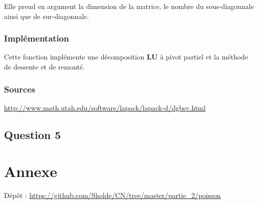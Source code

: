 \documentclass[11pt]{article}
\begin{document}
Elle prend en argument la dimension de la matrice, le nombre du
sous-diagonnale ainsi que de sur-diagonnale.

\subsubsection{Implémentation}
\label{sec:orgca7c1c3}

Cette fonction implémente une décomposition \textbf{LU} à pivot partiel et
la méthode de dessente et de remonté.

\subsubsection{Sources}
\label{sec:org86015d0}

\url{http://www.math.utah.edu/software/lapack/lapack-d/dgbsv.html}

\subsection{Question 5}
\label{sec:orgdb19e77}
\section{Annexe}
\label{sec:org4a46c2c}

Dépôt : \url{https://github.com/Sholde/CN/tree/master/partie\_2/poisson}
\end{document}
